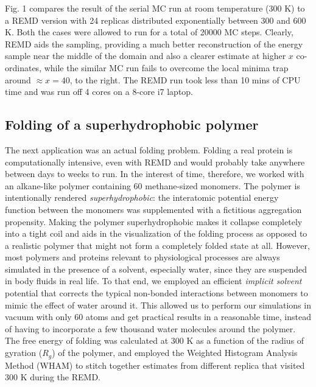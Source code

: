 \documentclass[12pt,letterpaper]{article}
\begin{document}
\noindent Fig. 1 compares the result of the serial MC run at room temperature (300 K) to a REMD version with 24 replicas distributed exponentially between 300 and 600 K. Both the cases were allowed to run for a total of 20000 MC steps. Clearly, REMD aids the sampling, providing a much better reconstruction of the energy sample near the middle of the domain and also a clearer estimate at higher $x$ co-ordinates, while the similar MC run fails to overcome the local minima trap around $\approx x = 40$, to the right. The REMD run took less than 10 mins of CPU time and was run off 4 cores on a 8-core i7 laptop.\\

\subsection*{Folding of a superhydrophobic polymer}
\noindent The next application was an actual folding problem. Folding a real protein is computationally intensive, even with REMD and would probably take anywhere between days to weeks to run. In the interest of time, therefore, we worked with an alkane-like polymer containing 60 methane-sized monomers. The polymer is intentionally rendered \textit{superhydrophobic}: the interatomic potential energy function between the monomers was supplemented with a fictitious aggregation propensity. Making the polymer superhydrophobic makes it collapse completely into a tight coil and aids in the visualization of the folding process as opposed to a realistic polymer that might not form a completely folded state at all. However, most polymers and proteins relevant to physiological processes are always simulated in the presence of a solvent, especially water, since they are suspended in body fluids in real life. To that end, we employed an efficient \textit{implicit solvent} potential\cite{sanyal16} that corrects the typical non-bonded interactions between monomers to mimic the effect of water around it. This allowed us to perform our simulations in vacuum with only 60 atoms and get practical results in a reasonable time, instead of having to incorporate a few thousand water molecules around the polymer. The free energy of folding was calculated at 300 K as a function of the radius of gyration ($R_g$) of the polymer, and employed the Weighted Histogram Analysis Method (WHAM)\cite{swendsen89} to stitch together estimates from different replica that visited 300 K during the REMD.
%
\end{document}
